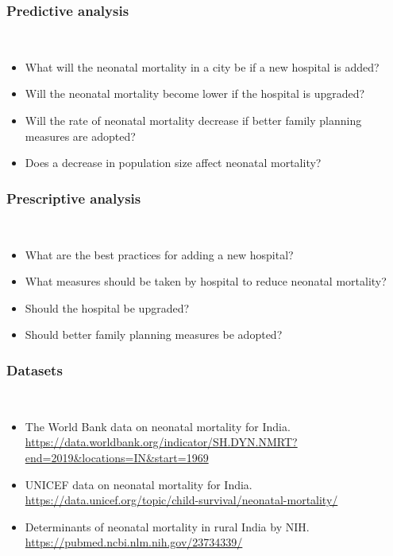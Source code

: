 \documentclass[12pt]{article}
\begin{document}
    \subsubsection*{Predictive analysis}\\
    \begin{itemize}
        \item What will the neonatal mortality in a city be if a new hospital is added?
        \item Will the neonatal mortality become lower if the hospital is upgraded?
        \item Will the rate of neonatal mortality decrease if better family planning measures are adopted?
        \item Does a decrease in population size affect neonatal mortality?
    \end{itemize}

    \subsubsection*{Prescriptive analysis}\\
    \begin{itemize}
        \item What are the best practices for adding a new hospital?
        \item What measures should be taken by hospital to reduce neonatal mortality?
        \item Should the hospital be upgraded?
        \item Should better family planning measures be adopted?
    \end{itemize}

    \subsubsection*{Datasets}\\
    \begin{itemize}
        \item The World Bank data on neonatal mortality for India.\\
        \url{https://data.worldbank.org/indicator/SH.DYN.NMRT?end=2019&locations=IN&start=1969}
        \item UNICEF data on neonatal mortality for India.\\
        \url{https://data.unicef.org/topic/child-survival/neonatal-mortality/ }
        \item Determinants of neonatal mortality in rural India by NIH.\\
        \url{https://pubmed.ncbi.nlm.nih.gov/23734339/}\\
    \end{itemize}    
\end{document}
